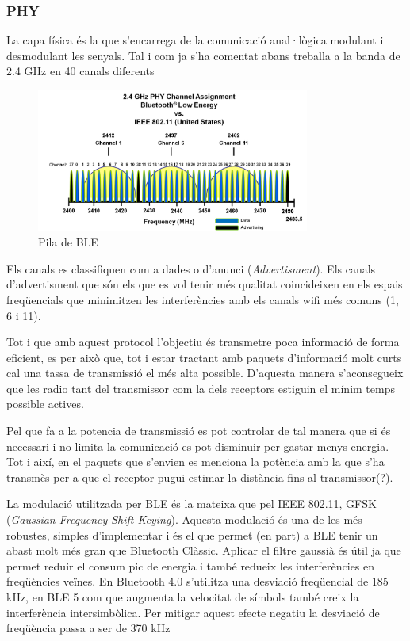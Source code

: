 \subsubsection{PHY}
La capa física és la que s'encarrega de la comunicació anal·lògica modulant i desmodulant les senyals.
Tal i com ja s'ha comentat abans treballa a la banda de 2.4 GHz en 40 canals diferents

\begin{figure}[h!]
	\begin{center}
		\includegraphics[width=0.8\textwidth]{./images/ble_channel_assignment.png}
		\caption{Pila de BLE \cite{ble_stack}}
		\label{ble_stack}
	\end{center}
\end{figure}

Els canals es classifiquen com a dades o d'anunci (\textit{Advertisment}). Els canals d'advertisment que són els que es vol tenir més qualitat coincideixen en els espais freqüencials que minimitzen les interferències amb els canals wifi més comuns (1, 6 i 11).

Tot i que amb aquest protocol l'objectiu és transmetre poca informació de forma eficient, es per això que, tot i estar tractant amb paquets d'informació molt curts cal una tassa de transmissió el més alta possible. D'aquesta manera s'aconsegueix que les radio tant del transmissor com la dels receptors estiguin el mínim temps possible actives.

Pel que fa a la potencia de transmissió es pot controlar de tal manera que si és necessari i no limita la comunicació es pot disminuir per gastar menys energia. Tot i així, en el paquets que s'envien es menciona la potència amb la que s'ha transmès per a que el receptor pugui estimar la distància fins al transmissor(?).

La modulació utilitzada per BLE és la mateixa que pel IEEE 802.11, GFSK (\textit{Gaussian Frequency Shift Keying}). Aquesta modulació és una de les més robustes, simples d'implementar i és el que permet (en part) a BLE tenir un abast molt més gran que Bluetooth Clàssic. Aplicar el filtre gaussià és útil ja que permet reduir el consum pic de energia \cite{BLE_Review} i també redueix les interferències en freqüències veïnes.
En Bluetooth 4.0 s'utilitza una desviació freqüencial de 185 kHz, en BLE 5 com que augmenta la velocitat de símbols també creix la interferència intersimbòlica. Per mitigar aquest efecte negatiu la desviació de freqüència passa a ser de 370 kHz


